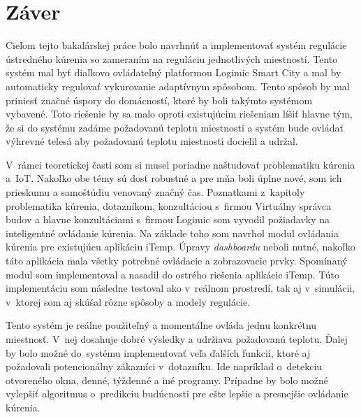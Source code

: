 \chapter{Záver}\label{zaver}
Cieľom tejto bakalárskej práce bolo navrhnúť a implementovať systém regulácie ústredného kúrenia so zameraním na reguláciu jednotlivých miestností. 
Tento systém mal byť diaľkovo ovládateľný platformou Logimic Smart City a mal by automaticky regulovať vykurovanie adaptívnym spôsobom. 
Tento spôsob by mal priniesť značné úspory do domácností, ktoré by boli takýmto systémom vybavené. 
Toto riešenie by sa malo oproti existujúcim riešeniam líšiť hlavne tým, že si do systému zadáme požadovanú teplotu miestnosti a systém bude ovládať výhrevné telesá aby požadovanú teplotu miestnosti docielil a udržal.

V~rámci teoretickej časti som si musel poriadne naštudovať problematiku kúrenia a~IoT. Nakoľko obe témy sú dosť robustné a pre mňa boli úplne nové, som ich prieskumu a samoštúdiu venovaný značný čas. Poznatkami z~kapitoly problematika kúrenia, dotazníkom, konzultáciou s~firmou Virtuálny správca budov a hlavne konzultáciami s~firmou Logimic som vyvodil požiadavky na inteligentné ovládanie kúrenia. Na základe toho som navrhol modul ovládania kúrenia pre existujúcu aplikáciu iTemp. Úpravy \emph{dashboardu} neboli nutné, nakoľko táto aplikácia mala všetky potrebné ovládacie a zobrazovacie prvky. Spomínaný modul som implementoval a nasadil do ostrého riešenia aplikácie iTemp.
Túto implementáciu som následne testoval ako v~reálnom prostredí, tak aj v~simulácii, v~ktorej som aj skúšal rôzne spôsoby a modely regulácie.

Tento systém je reálne použiteľný a momentálne ovláda jednu konkrétnu miestnosť. V~nej dosahuje dobré výsledky a udržiava požadovanú teplotu. Ďalej by bolo možné do~systému implementovať veľa ďalších funkcií, ktoré aj požadovali potencionálny zákazníci v~dotazníku. Ide napríklad o~detekciu otvoreného okna, denné, týždenné a iné programy. Prípadne by bolo možné vylepšiť algoritmus o~predikciu budúcnosti pre ešte lepšie a presnejšie ovládanie kúrenia.
